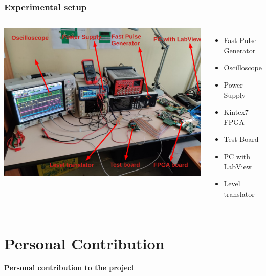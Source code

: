 \documentclass[aspectratio=169]{beamer}
\begin{document}
	\begin{frame}
	\frametitle{Experimental setup}
		\begin{columns}
			\begin{center}
				\includegraphics[width=0.95 \textwidth]{IMG/TestBench.pdf}
			\end{center}
			\begin{itemize}
				\item Fast Pulse Generator
				\item Oscilloscope
				\item Power Supply
				\item Kintex7 FPGA
				\item Test Board
				\item PC with LabView
				\item Level translator
			\end{itemize}
		\end{columns}
		
	\end{frame}



	\section{Personal Contribution}
	
	\begin{frame}
		\begin{center}
			{\Huge {}\selectfont \color{blue} \textbf{Personal contribution to the project}}
		\end{center}
	\end{frame}
	
\end{document}
